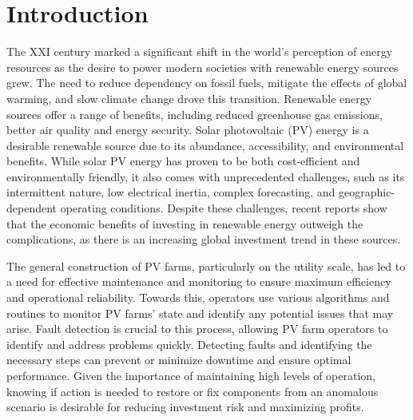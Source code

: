 \chapter{Introduction} \label{chap:chap1}


The XXI century marked a significant shift in the world's perception of energy resources as the desire to power modern societies with renewable energy sources grew. The need to reduce dependency on fossil fuels, mitigate the effects of global warming, and slow climate change drove this transition. Renewable energy sources offer a range of benefits, including reduced greenhouse gas emissions, better air quality and energy security. Solar photovoltaic (PV) energy is a desirable renewable source due to its abundance, accessibility, and environmental benefits. While solar PV energy has proven to be both cost-efficient and environmentally friendly, it also comes with unprecedented challenges, such as its intermittent nature, low electrical inertia, complex forecasting, and geographic-dependent operating conditions. Despite these challenges, recent reports \cite{cap} show that the economic benefits of investing in renewable energy outweigh the complications, as there is an increasing global investment trend in these sources.

The general construction of PV farms, particularly on the utility scale, has led to a need for effective maintenance and monitoring to ensure maximum efficiency and operational reliability. Towards this, operators use various algorithms and routines to monitor PV farms' state and identify any potential issues that may arise. Fault detection is crucial to this process, allowing PV farm operators to identify and address problems quickly. Detecting faults and identifying the necessary steps can prevent or minimize downtime and ensure optimal performance. Given the importance of maintaining high levels of operation, knowing if action is needed to restore or fix components from an anomalous scenario is desirable for reducing investment risk and maximizing profits.

